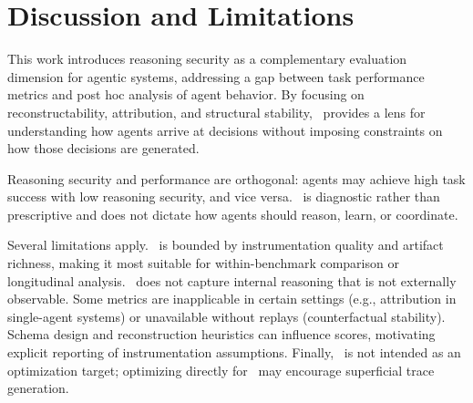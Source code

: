 \section{Discussion and Limitations}
This work introduces reasoning security as a complementary evaluation dimension for agentic systems, addressing a gap between task performance metrics and post hoc analysis of agent behavior. By focusing on reconstructability, attribution, and structural stability, \RSS\ provides a lens for understanding how agents arrive at decisions without imposing constraints on how those decisions are generated.

Reasoning security and performance are orthogonal: agents may achieve high task success with low reasoning security, and vice versa. \RSS\ is diagnostic rather than prescriptive and does not dictate how agents should reason, learn, or coordinate.

Several limitations apply. \RSS\ is bounded by instrumentation quality and artifact richness, making it most suitable for within-benchmark comparison or longitudinal analysis. \RSS\ does not capture internal reasoning that is not externally observable. Some metrics are inapplicable in certain settings (e.g., attribution in single-agent systems) or unavailable without replays (counterfactual stability). Schema design and reconstruction heuristics can influence scores, motivating explicit reporting of instrumentation assumptions. Finally, \RSS\ is not intended as an optimization target; optimizing directly for \RSS\ may encourage superficial trace generation.
